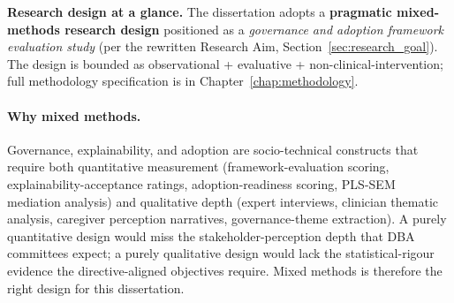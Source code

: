 \noindent\textbf{Research design at a glance.} The dissertation adopts a \textbf{pragmatic mixed-methods research design} positioned as a \emph{governance and adoption framework evaluation study} (per the rewritten Research Aim, Section~\ref{sec:research_goal}). The design is bounded as observational + evaluative + non-clinical-intervention; full methodology specification is in Chapter~\ref{chap:methodology}.

\paragraph{Why mixed methods.} Governance, explainability, and adoption are socio-technical constructs that require both quantitative measurement (framework-evaluation scoring, explainability-acceptance ratings, adoption-readiness scoring, PLS-SEM mediation analysis) and qualitative depth (expert interviews, clinician thematic analysis, caregiver perception narratives, governance-theme extraction). A purely quantitative design would miss the stakeholder-perception depth that DBA committees expect; a purely qualitative design would lack the statistical-rigour evidence the directive-aligned objectives require. Mixed methods is therefore the right design for this dissertation.

